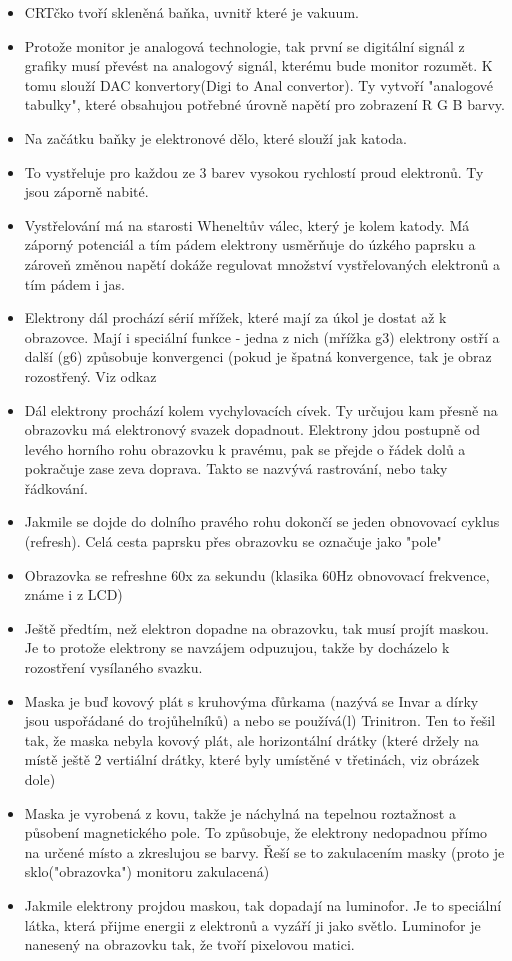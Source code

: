 \documentclass[10pt,a4paper]{article}
\begin{document}
\begin{itemize}
\item CRTčko tvoří skleněná baňka, uvnitř které je vakuum.
\item Protože monitor je analogová technologie, tak první se digitální signál z grafiky musí převést na analogový signál, kterému bude monitor rozumět. K tomu slouží DAC konvertory(Digi to Anal convertor). Ty vytvoří "analogové tabulky", které obsahujou potřebné úrovně napětí pro zobrazení R G B barvy.
\item Na začátku baňky je elektronové dělo, které slouží jak katoda.
\item To vystřeluje pro každou ze 3 barev vysokou rychlostí proud elektronů. Ty jsou záporně nabité.
\item Vystřelování má na starosti Wheneltův válec, který je kolem katody. Má záporný potenciál a tím pádem elektrony usměrňuje do úzkého paprsku a zároveň změnou napětí dokáže regulovat množství vystřelovaných elektronů a tím pádem i jas.
\item Elektrony dál prochází sérií mřížek, které mají za úkol je dostat až k obrazovce. Mají i speciální funkce - jedna z nich (mřížka g3) elektrony ostří a další (g6) způsobuje konvergenci (pokud je špatná konvergence, tak je obraz rozostřený. Viz odkaz
\item Dál elektrony prochází kolem vychylovacích cívek. Ty určujou kam přesně na obrazovku má elektronový svazek dopadnout. Elektrony jdou postupně od levého horního rohu obrazovku k pravému, pak se přejde o řádek dolů a pokračuje zase zeva doprava. Takto se nazvývá rastrování, nebo taky řádkování.
\item Jakmile se dojde do dolního pravého rohu dokončí se jeden obnovovací cyklus (refresh). Celá cesta paprsku přes obrazovku se označuje jako "pole" 
\item Obrazovka se refreshne 60x za sekundu (klasika 60Hz obnovovací frekvence, známe i z LCD)
\item Ještě předtím, než elektron dopadne na obrazovku, tak musí projít maskou. Je to protože elektrony se navzájem odpuzujou, takže by docházelo k rozostření vysílaného svazku.
\item Maska je buď kovový plát s kruhovýma ďůrkama (nazývá se Invar a dírky jsou uspořádané do trojůhelníků) a nebo se používá(l) Trinitron. Ten to řešil tak, že maska nebyla kovový plát, ale horizontální drátky (které držely na místě ještě 2 vertiální drátky, které byly umístěné v třetinách, viz obrázek dole)
\item Maska je vyrobená z kovu, takže je náchylná na tepelnou roztažnost a působení magnetického pole. To způsobuje, že elektrony nedopadnou přímo na určené místo a zkreslujou se barvy. Řeší se to zakulacením masky (proto je sklo("obrazovka") monitoru zakulacená)
\item Jakmile elektrony projdou maskou, tak dopadají na luminofor. Je to speciální látka, která přijme energii z elektronů a vyzáří ji jako světlo. Luminofor je nanesený na obrazovku tak, že tvoří pixelovou matici. 
\end{itemize}
\end{document}
